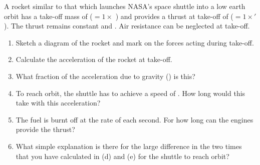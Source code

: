 
\begin{problem}[Robin8]
{A rocket similar to that which launches NASA’s space shuttle into a low earth orbit has a take-off mass of  ($ =  1\times$ ) and provides a thrust at take-off of  ($ = 1\times'$). The thrust remains constant and .  Air resistance can be neglected at take-off. 
\begin{enumerate}
	\item Sketch a diagram of the rocket and mark on the forces acting during take-off.
	\item Calculate the acceleration of the rocket at take-off.
	\item What fraction of the acceleration due to gravity () is this?
	\item To reach orbit, the shuttle has to achieve a speed of .  How long would this take with this acceleration?
	\item The fuel is burnt off at the rate of  each second.  For how long can the engines provide the thrust?
	\item What simple explanation is there for the large difference in the two times that you have calculated in (d) and (e) for the shuttle to reach orbit?
\end{enumerate}
}
{}
{}
\end{problem}